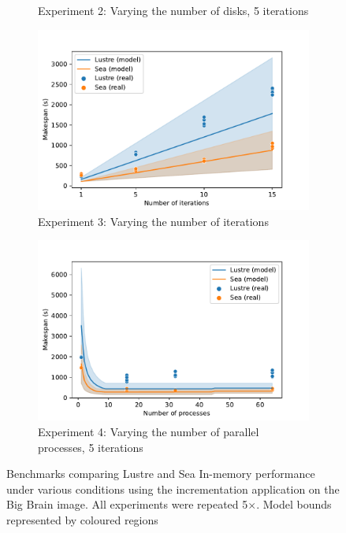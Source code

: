 \documentclass[10pt,journal,compsoc]{IEEEtran}
\begin{document}
\begin{figure}
\begin{subfigure}{\columnwidth}
        \caption{Experiment 2: Varying the number of disks, 5
        iterations}\label{fig:sea-comp:disks}
    \end{subfigure}
    \begin{subfigure}{\columnwidth}
        \centering
        \captionsetup{width=.85\linewidth}
        \includegraphics[width=\linewidth]{figures/iterations.pdf}
        \caption{Experiment 3: Varying the number of
        iterations}\label{fig:sea-comp:iterations}
    \end{subfigure}
    \begin{subfigure}{\columnwidth}
        \centering
        \captionsetup{width=.85\linewidth}
        \includegraphics[width=\linewidth]{figures/threads.pdf}
        \caption{Experiment 4: Varying the number of parallel processes, 5
        iterations}\label{fig:sea-comp:processes}
    \end{subfigure}
    \caption{Benchmarks comparing Lustre and Sea In-memory performance under
    various conditions using the incrementation application on the Big Brain
    image. All experiments were repeated 5$\times$. Model bounds represented by
    coloured regions}
    \label{fig:sea-comp:benchmarks}
    \end{figure}
\end{document}

